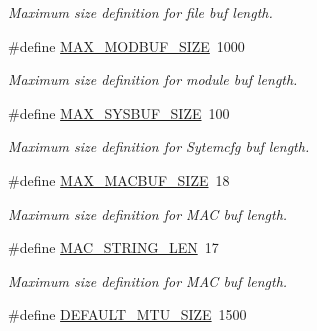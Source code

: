 \begin{DoxyCompactItemize}
\begin{DoxyCompactList}\small\item\em Maximum size definition for file buf length. \end{DoxyCompactList}\item 
\hypertarget{group__FAPI__SYSTEM_ga04ba87389b3bd81e6444e18efa6ff9f5}{\#define \hyperlink{group__FAPI__SYSTEM_ga04ba87389b3bd81e6444e18efa6ff9f5}{M\-A\-X\-\_\-\-M\-O\-D\-B\-U\-F\-\_\-\-S\-I\-Z\-E}~1000}\label{group__FAPI__SYSTEM_ga04ba87389b3bd81e6444e18efa6ff9f5}

\begin{DoxyCompactList}\small\item\em Maximum size definition for module buf length. \end{DoxyCompactList}\item 
\hypertarget{group__FAPI__SYSTEM_ga186ef75cc7176935c3fda3ff7c8054c5}{\#define \hyperlink{group__FAPI__SYSTEM_ga186ef75cc7176935c3fda3ff7c8054c5}{M\-A\-X\-\_\-\-S\-Y\-S\-B\-U\-F\-\_\-\-S\-I\-Z\-E}~100}\label{group__FAPI__SYSTEM_ga186ef75cc7176935c3fda3ff7c8054c5}

\begin{DoxyCompactList}\small\item\em Maximum size definition for Sytemcfg buf length. \end{DoxyCompactList}\item 
\hypertarget{group__FAPI__SYSTEM_ga892276a9c802ab10d4a05733575c0601}{\#define \hyperlink{group__FAPI__SYSTEM_ga892276a9c802ab10d4a05733575c0601}{M\-A\-X\-\_\-\-M\-A\-C\-B\-U\-F\-\_\-\-S\-I\-Z\-E}~18}\label{group__FAPI__SYSTEM_ga892276a9c802ab10d4a05733575c0601}

\begin{DoxyCompactList}\small\item\em Maximum size definition for M\-A\-C buf length. \end{DoxyCompactList}\item 
\hypertarget{group__FAPI__SYSTEM_ga41846d75e59371e20270ee8bac851cc9}{\#define \hyperlink{group__FAPI__SYSTEM_ga41846d75e59371e20270ee8bac851cc9}{M\-A\-C\-\_\-\-S\-T\-R\-I\-N\-G\-\_\-\-L\-E\-N}~17}\label{group__FAPI__SYSTEM_ga41846d75e59371e20270ee8bac851cc9}

\begin{DoxyCompactList}\small\item\em Maximum size definition for M\-A\-C buf length. \end{DoxyCompactList}\item 
\hypertarget{group__FAPI__SYSTEM_gab463e7cce50e0fa472b4b08ac0fe258c}{\#define \hyperlink{group__FAPI__SYSTEM_gab463e7cce50e0fa472b4b08ac0fe258c}{D\-E\-F\-A\-U\-L\-T\-\_\-\-M\-T\-U\-\_\-\-S\-I\-Z\-E}~1500}\label{group__FAPI__SYSTEM_gab463e7cce50e0fa472b4b08ac0fe258c}


\end{DoxyCompactItemize}
